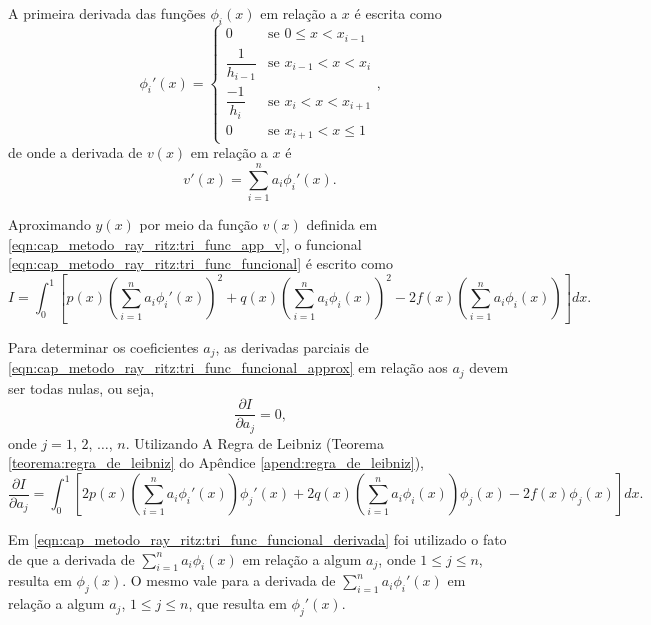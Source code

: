 \documentclass[
	12pt,				%
	openright,			%
    twoside,			%
	a4paper,			%
	chapter=TITLE,		%
	english,			%
	french,				%
	spanish,			%
	brazil				%
	]{abntex2}
\numberwithin{lema}{chapter}
\numberwithin{teorema}{chapter}
\numberwithin{definicao}{chapter}
\numberwithin{exemplo}{chapter}
\numberwithin{figure}{chapter}
\begin{document}
A primeira derivada das funções $\phi_i(x)$ em relação a $x$ é escrita como
\begin{equation}
	\label{eqn:cap_metodo_ray_ritz:tri_func_phi_diff}
	\phi_i ' (x) = 
		\begin{cases}
			0 							& \mbox{se } 0 \leqslant x < x_{i - 1}\\[5pt]
			\dfrac{1}{h_{i-1}} 			& \mbox{se } x_{i-1} < x < x_i\\[10pt]
			\dfrac{-1}{h_i}				& \mbox{se } x_i < x < x_{i+1}\\[5pt]
			0							& \mbox{se } x_{i+1}<x\leqslant 1
		\end{cases}
	\text{,}
\end{equation}
de onde a derivada de $v(x)$ em relação a $x$ é
\begin{equation}
	v'(x)=\sum_{i=1}^{n} a_i \phi_i '(x)
	\text{.}
\end{equation}

Aproximando $y(x)$ por meio da função $v(x)$ definida em \eqref{eqn:cap_metodo_ray_ritz:tri_func_app_v}, o funcional \eqref{eqn:cap_metodo_ray_ritz:tri_func_funcional} é escrito como
\begin{equation}
	\label{eqn:cap_metodo_ray_ritz:tri_func_funcional_approx}
	I = \int_{0}^{1} \left [
		p(x) \left (
			\sum_{i=1}^{n} a_i \phi_i '(x)
		\right )^2
		+ q(x) \left (
			\sum_{i=1}^{n} a_i \phi_i (x)
		\right )^2
		- 2f(x) \left (
			\sum_{i=1}^{n} a_i \phi_i (x)
		\right )
	\right ] dx
	\text{.}
\end{equation}

Para determinar os coeficientes $a_j$, as derivadas parciais de \eqref{eqn:cap_metodo_ray_ritz:tri_func_funcional_approx} em relação aos $a_j$ devem ser todas nulas, ou seja,
$$
	\frac{\partial I}{\partial a_j} = 0
	\text{,}
$$
onde $j=1$, $2$, $\dots$, $n$. Utilizando A Regra de Leibniz (Teorema \ref{teorema:regra_de_leibniz} do Apêndice \ref{apend:regra_de_leibniz}),
\begin{equation}
	\label{eqn:cap_metodo_ray_ritz:tri_func_funcional_derivada}
	\frac{\partial I}{\partial a_j} = 
	\int_{0}^{1} \left [
		2p(x) \left (
			\sum_{i=1}^{n} a_i \phi_i'(x)
		\right ) \phi_j'(x)
		+ 2q(x) \left (
			\sum_{i=1}^{n} a_i \phi_i(x)
		\right ) \phi_j(x)
		- 2f(x)\phi_j(x)
	\right ] dx
	\text{.}
\end{equation}

Em \eqref{eqn:cap_metodo_ray_ritz:tri_func_funcional_derivada} foi utilizado o fato de que a derivada de $\displaystyle \sum_{i=1}^{n} a_i \phi_i(x)$ em relação a algum $a_j$, onde $1\leqslant j\leqslant n$, resulta em $\phi_j(x)$. O mesmo vale para a derivada de $\displaystyle \sum_{i=1}^{n} a_i \phi_i'(x)$ em relação a algum $a_j$, $1\leqslant j\leqslant n$, que resulta em $\phi_j'(x)$.
\end{document}
